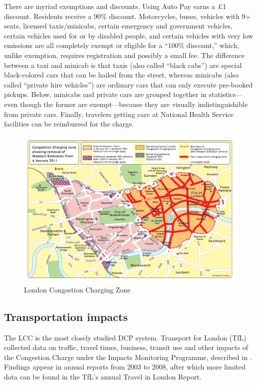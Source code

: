 There are myriad exemptions and discounts. Using Auto Pay earns a \pounds1 discount. Residents receive a 90\% discount. Motorcycles, buses, vehicles with 9+ seats, licensed taxis/minicabs, certain emergency and government vehicles, certain vehicles used for or by  disabled people, and certain vehicles with very low emissions are all completely exempt or eligible for a ``100\% discount,'' which, unlike exemption, requires registration and possibly a small fee. The difference between a taxi and minicab is that taxis (also called ``black cabs'') are special black-colored cars that can be hailed from the street, whereas minicabs (also called ``private hire vehicles'') are ordinary cars that can only execute pre-booked pickups. Below, minicabs and private cars are grouped together in statistics---even though the former are exempt---because they are visually indistinguishible from private cars. Finally, travelers getting care at National Health Service facilities can be reimbursed for the charge.

\begin{figure}[ht]
    \includegraphics[width=1\textwidth]{../img/london-congestion-charge.png}
    
    \caption{London Congestion Charging Zone \label{fig:London-Congestion-Charging}}
\end{figure}


\subsection{Transportation impacts}

The LCC is the most closely studied DCP system. Transport for London (TfL) collected data on traffic, travel times, business, transit use and other impacts of the Congestion Charge under the Impacts Monitoring Programme, described in \citet[Sec. 1]{TfLFirst2003}. Findings appear in annual reports from 2003 to 2008, after which more limited data can be found in the TfL's annual Travel in London Report.

